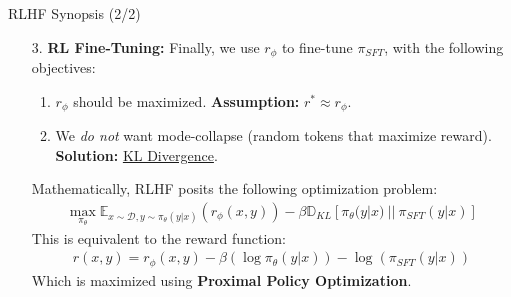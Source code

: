 \documentclass{beamer}
\begin{document}
\begin{frame}{RLHF Synopsis (2/2)}
	\begin{enumerate}
		\item[3.] \textbf{RL Fine-Tuning:} Finally, we use $r_\phi$ to fine-tune $\pi_{SFT}$, with the following objectives:
			\begin{enumerate}[label=\alph*.]
				\item $r_\phi$ should be maximized. \textbf{Assumption:} $r^* \approx r_\phi$. \pause
				\item We \textit{do not} want mode-collapse (random tokens that maximize reward). \pause \textbf{Solution:} \underline{KL Divergence}. \pause
			\end{enumerate}
			Mathematically, RLHF posits the following optimization problem:
			\begin{gather}
				\max_{\pi_\theta}\mathbb{E}_{x\sim\mathcal{D}, y \sim \pi_\theta(y|x)}(r_\phi(x,y)) -\beta \mathbb{D}_{KL}[\pi_\theta(y|x)~||~\pi_{SFT}(y|x)]
			\end{gather} \pause
			This is equivalent to the reward function:
			\begin{gather}
				r(x,y) = r_\phi(x,y) - \beta(\log \pi_\theta(y|x)) - \log(\pi_{SFT}(y|x))
			\end{gather}
			Which is maximized using \textbf{Proximal Policy Optimization}.
	\end{enumerate}
\end{frame}
\end{document}
